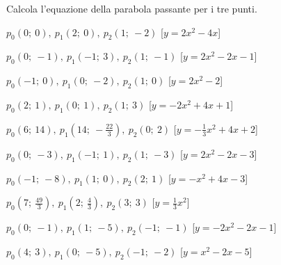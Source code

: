 \begin{esercizio}\label{ese:}
 Calcola l'equazione della parabola passante per i tre punti.
 \begin{enumeratea}
  \item  $p_0 \left (0;~0 \right ),~p_1 \left (2;~0 \right ),~p_2 \left (1;~-2 \right )$
   \hfill [$y=2 x^2 -4 x $]
  \item  $p_0 \left (0;~-1 \right ),~p_1 \left (-1;~3 \right ),~p_2 \left (1;~-1 \right )$
   \hfill [$y=2 x^2 -2 x -1$]
  \item  $p_0 \left (-1;~0 \right ),~p_1 \left (0;~-2 \right ),~p_2 \left (1;~0 \right )$
   \hfill [$y=2 x^2 -2$]
  \item  $p_0 \left (2;~1 \right ),~p_1 \left (0;~1 \right ),~p_2 \left (1;~3 \right )$
   \hfill [$y=-2 x^2 +4 x +1$]
  \item  $p_0 \left (6;~14 \right ),~p_1 \left (14;~-\frac{22}{3} \right ),~p_2 \left (0;~2 \right )$
   \hfill [$y=-\frac{1}{3} x^2 +4 x +2$]
  \item  $p_0 \left (0;~-3 \right ),~p_1 \left (-1;~1 \right ),~p_2 \left (1;~-3 \right )$
   \hfill [$y=2 x^2 -2 x -3$]
  \item  $p_0 \left (-1;~-8 \right ),~p_1 \left (1;~0 \right ),~p_2 \left (2;~1 \right )$
   \hfill [$y=- x^2 +4 x -3$]
  \item  $p_0 \left (7;~\frac{49}{3} \right ),~p_1 \left (2;~\frac{4}{3} \right ),~p_2 \left (3;~3 \right )$
   \hfill [$y=\frac{1}{3} x^2 $]
  \item  $p_0 \left (0;~-1 \right ),~p_1 \left (1;~-5 \right ),~p_2 \left (-1;~-1 \right )$
   \hfill [$y=-2 x^2 -2 x -1$]
  \item  $p_0 \left (4;~3 \right ),~p_1 \left (0;~-5 \right ),~p_2 \left (-1;~-2 \right )$
   \hfill [$y=x^2 -2 x -5$]

\end{enumeratea}
\end{esercizio}
